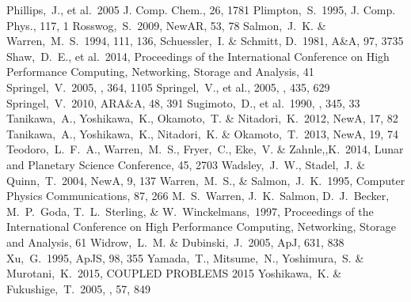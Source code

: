 \documentclass[proof]{pasj01}
\begin{document}
\begin{thebibliography}{}
Phillips,~J., et al.\ 2005 J. Comp. Chem., 26, 1781
Plimpton,~S.\ 1995, J. Comp. Phys., 117, 1
{Rosswog},~S.\ 2009, NewAR, 53, 78
{Salmon},~J.~K. \& {Warren},~M.~S.\ 1994, 111, 136,
{Schuessler},~I. \& {Schmitt}, D.\ 1981, A\&A, 97, 3735
Shaw,~D.~E., et al.\ 2014, Proceedings of the International Conference on High Performance Computing, Networking, Storage and Analysis, 41
{Springel},~V.\ 2005, \mnras, 364, 1105
{Springel},~V., et al., 2005, \nat, 435, 629
{Springel},~V.\ 2010, ARA\&A, 48, 391
Sugimoto,~D., et al.\ 1990, \nat, 345, 33
{Tanikawa},~A., {Yoshikawa},~K., {Okamoto},~T. \& {Nitadori},~K.\ 2012, NewA, 17, 82
{Tanikawa},~A., {Yoshikawa},~K., {Nitadori},~K. \& {Okamoto},~T.\ 2013, NewA, 19, 74
{{Teodoro},~L.~F.~A., {Warren},~M.~S., {Fryer},~C., {Eke},~V. \& {Zahnle},,K.}\ 2014, Lunar and Planetary Science Conference, 45, 2703
{Wadsley},~J.~W., {Stadel},~J. \& {Quinn},~T.\ 2004, NewA, 9, 137
{Warren},~M.~S., \& {Salmon},~J.~K.\ 1995, Computer Physics Communications, 87, 266
M.~S.~Warren, J.~K.~Salmon, D.~J.~Becker, M.~P.~Goda, T.~L.~Sterling, \& W.~Winckelmans,\ 1997, Proceedings of the International Conference on High Performance Computing, Networking, Storage and Analysis, 61
{{Widrow},~L.~M. \& {Dubinski},~J.}\ 2005, ApJ, 631, 838
{Xu},~G.\ 1995, ApJS, 98, 355
Yamada,~T., Mitsume,~N., Yoshimura,~S. \& Murotani,~K.\ 2015, COUPLED PROBLEMS 2015
{Yoshikawa},~K. \& {Fukushige},~T.\ 2005, \pasj, 57, 849
  
\end{thebibliography}
\end{document}
